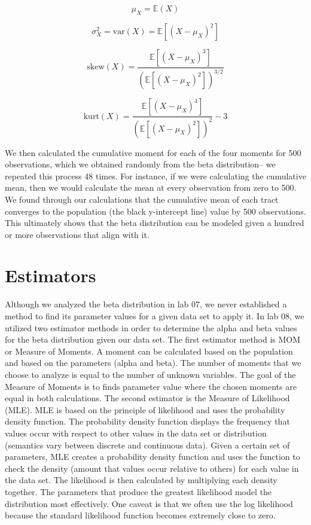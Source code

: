 \documentclass{article}\usepackage[]{graphicx}\usepackage[]{xcolor}
\begin{document}
\begin{multicols}{2}
\[
\mu_X = \mathbb{E}(X)
\]

\[
\sigma_X^2 = \mathrm{var}(X) = \mathbb{E} \left[ (X - \mu_X)^2 \right]
\]

\[
\mathrm{skew}(X) = \frac{\mathbb{E} \left[ (X - \mu_X)^3 \right]}{\left( \mathbb{E} \left[ (X - \mu_X)^2 \right] \right)^{3/2}}
\]

\[
\mathrm{kurt}(X) = \frac{\mathbb{E} \left[ (X - \mu_X)^4 \right]}{\left( \mathbb{E} \left[ (X - \mu_X)^2 \right] \right)^2} - 3
\]

We then calculated the cumulative moment for each of the four moments for 500 observations, which we obtained randomly from the beta distribution-- we repeated this process 48 times. For instance, if we were calculating the cumulative mean, then we would calculate the mean at every observation from zero to 500. We found through our calculations that the cumulative mean of each tract converges to the population (the black y-intercept line) value by 500 observations. 
This ultimately shows that the beta distribution can be modeled given a hundred or more observations that align with it. 

\section{Estimators}
  Although we analyzed the beta distribution in lab 07, we never established a method to find its parameter values for a given data set to apply it. In lab 08, we utilized two estimator methods in order to determine the alpha and beta values for the beta distribution given our data set. The first estimator method is MOM or Measure of Moments. A moment can be calculated based on the population and based on the parameters (alpha and beta). The number of moments that we choose to analyze is equal to the number of unknown variables. The goal of the Measure of Moments is to finds parameter value where the chosen moments are equal in both calculations. The second estimator is the Measure of Likelihood (MLE). MLE is based on the principle of likelihood and uses the probability density function. The probability density function displays the frequency that values occur with respect to other values in the data set or distribution (semantics vary between discrete and continuous data). Given a certain set of parameters, MLE creates a probability density function and uses the function to check the density (amount that values occur relative to others) for each value in the data set. The likelihood is then calculated by multiplying each density together. The parameters that produce the greatest likelihood model the distribution most effectively. One caveat is that we often use the log likelihood because the standard likelihood function becomes extremely close to zero. 


\end{multicols}
\end{document}
